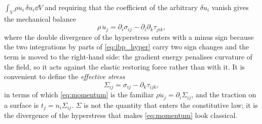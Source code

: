 $\int_V\rho\ddot u_i\,\delta u_i\dd V$ and requiring that the coefficient of the
arbitrary $\delta u_i$ vanish gives the mechanical balance
\begin{equation}
\label{eq:momentum}
\rho\,\ddot u_j=\partial_i\sigma_{ij}-\partial_i\partial_k\tau_{jik},
\end{equation}
where the double divergence of the hyperstress enters with a minus sign because
the two integrations by parts of \eqref{eq:ibp_hyper} carry two sign changes and
the term is moved to the right-hand side: the gradient energy penalises
curvature of the field, so it acts against the elastic restoring force rather
than with it.  It is convenient to define the
\emph{effective stress}
\begin{equation}
\label{eq:effective}
\Sigma_{ij}=\sigma_{ij}-\partial_k\tau_{ijk},
\end{equation}
in terms of which \eqref{eq:momentum} is the familiar $\rho\ddot u_j=
\partial_i\Sigma_{ij}$, and the traction on a surface is $t_j=n_i\Sigma_{ij}$.
$\Sigma$ is not the quantity that enters the constitutive law; it is the
divergence of the hyperstress that makes \eqref{eq:momentum} look classical.


